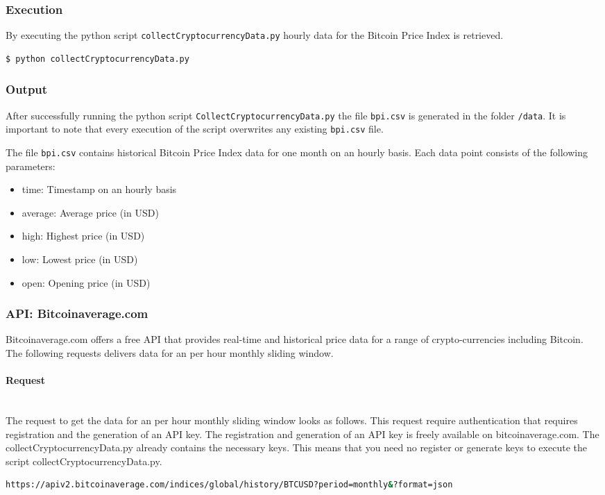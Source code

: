 \documentclass[a4paper,12pt]{article}
\begin{document}
\begin{spacing}{1.2}
\subsubsection{Execution}
By executing the python script \verb|collectCryptocurrencyData.py| hourly data for the Bitcoin Price Index is retrieved.
\begin{lstlisting}[language=bash]
    $ python collectCryptocurrencyData.py
\end{lstlisting}

\subsubsection{Output}
After successfully running the python script \verb|CollectCryptocurrencyData.py| the file \verb|bpi.csv| is generated in the folder \verb|/data|. It is important to note that every execution of the script overwrites any existing \verb|bpi.csv| file.

The file \verb|bpi.csv| contains historical Bitcoin Price Index data for one month on an hourly basis. Each data point consists of the following parameters:
\begin{itemize}
    \item time: Timestamp on an hourly basis
    \item average: Average price (in USD)
    \item high: Highest price (in USD)
    \item low: Lowest price (in USD)
    \item open: Opening price (in USD)
\end{itemize}

\subsubsection{API: Bitcoinaverage.com}
Bitcoinaverage.com offers a free API that provides real-time and historical price data for a range of crypto-currencies including Bitcoin. The following requests delivers data for an per hour monthly sliding window.
\paragraph{Request}\mbox{}\\
The request to get the data for an per hour monthly sliding window looks as follows. This request require authentication that requires registration and the generation of an API key. The registration and generation of an API key is freely available on bitcoinaverage.com. The collectCryptocurrencyData.py already contains the necessary keys. This means that you need no register or generate keys to execute the script collectCryptocurrencyData.py.  
\begin{lstlisting}[language=bash]
https://apiv2.bitcoinaverage.com/indices/global/history/BTCUSD?period=monthly&?format=json
\end{lstlisting}

\end{spacing}
\end{document}
